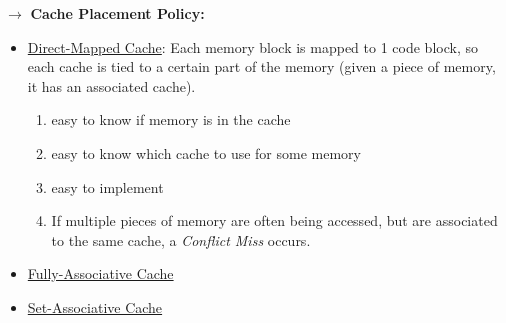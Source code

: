 \documentclass{report}
\begin{document}
    \newpage
    $\to$ \textbf{Cache Placement Policy:}
    \begin{itemize}
      \item \underline{Direct-Mapped Cache}: Each memory block is mapped to 1 code block, so each cache is tied to a certain part of the memory (given a piece of memory, it has an associated cache).
        \begin{enumerate}
          \item easy to know if memory is in the cache
          \item easy to know which cache to use for some memory
          \item easy to implement
          \item If multiple pieces of memory are often being accessed, but are associated to the same cache, a \emph{Conflict Miss} occurs.
        \end{enumerate}
      \item \underline{Fully-Associative Cache} 
      \item \underline{Set-Associative Cache} \\
    \end{itemize}

    
\end{document}
